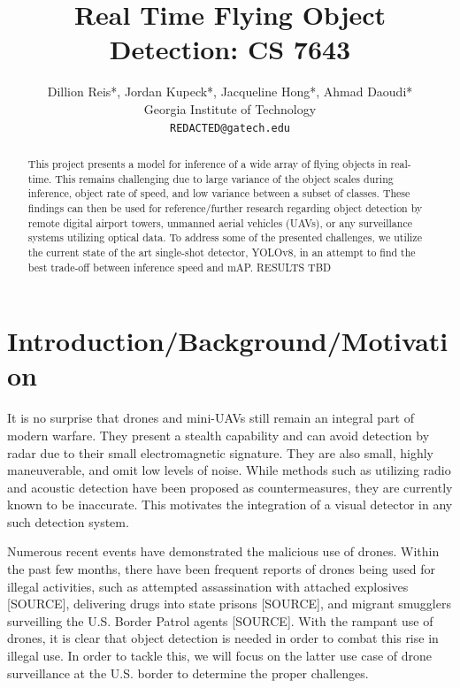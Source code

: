 \documentclass[10pt,twocolumn,letterpaper]{article}
\begin{document}
\title{Real Time Flying Object Detection: CS 7643}

\author{Dillion Reis*, Jordan Kupeck*, Jacqueline Hong*, Ahmad Daoudi*\\
Georgia Institute of Technology\\
{\tt\small {REDACTED}@gatech.edu}
}

\maketitle

\begin{abstract}
   This project presents a model for inference of a wide array of flying objects in real-time. 
   This remains challenging due to large variance of the object scales during inference, object rate of speed, 
   and low variance between a subset of classes. These findings can then be used for reference/further research 
   regarding object detection by remote digital airport towers, unmanned aerial vehicles (UAVs), or any surveillance 
   systems utilizing optical data. To address some of the presented challenges, we utilize the current state of the art 
   single-shot detector, YOLOv8, in an attempt to find the best trade-off between inference speed and mAP. RESULTS TBD
\end{abstract}

\section{Introduction/Background/Motivation}
It is no surprise that drones and mini-UAVs still remain an integral part of modern warfare. They present a stealth capability 
and can avoid detection by radar due to their small electromagnetic signature. They are also small, highly maneuverable, and 
omit low levels of noise. While methods such as utilizing radio and acoustic detection have been proposed as countermeasures, they 
are currently known to be inaccurate. This motivates the integration of a visual detector in any such detection system.

Numerous recent events have demonstrated the malicious use of drones. Within the past few months, there have been frequent reports of drones being used for illegal activities, such as attempted assassination with attached explosives [SOURCE], delivering drugs into state prisons [SOURCE], and migrant smugglers surveilling the U.S. Border Patrol agents [SOURCE]. With the rampant use of drones, it is clear that object detection is needed in order to combat this rise in illegal use. In order to tackle this, we will focus on the latter use case of drone surveillance at the U.S. border to determine the proper challenges.
\end{document}
